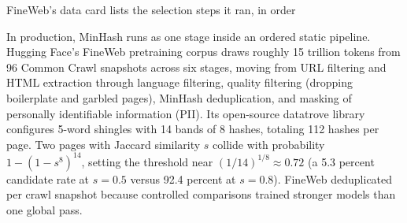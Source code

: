 \documentclass[aspectratio=169, 12pt]{beamer}
\begin{document}
\begin{frame}{FineWeb's data card lists the selection steps it ran, in order}
{    In production, MinHash runs as one stage inside an ordered static pipeline. Hugging Face's FineWeb pretraining corpus draws roughly 15 trillion tokens from 96 Common Crawl snapshots across six stages, moving from URL filtering and HTML extraction through language filtering, quality filtering (dropping boilerplate and garbled pages), MinHash deduplication, and masking of personally identifiable information (PII). Its open-source datatrove library configures 5-word shingles with 14 bands of 8 hashes, totaling 112 hashes per page. Two pages with Jaccard similarity $s$ collide with probability $1 - (1 - s^{8})^{14}$, setting the threshold near $(1/14)^{1/8} \approx 0.72$ (a 5.3 percent candidate rate at $s=0.5$ versus 92.4 percent at $s=0.8$). FineWeb deduplicated per crawl snapshot because controlled comparisons trained stronger models than one global pass.



  }
\end{frame}
\end{document}
